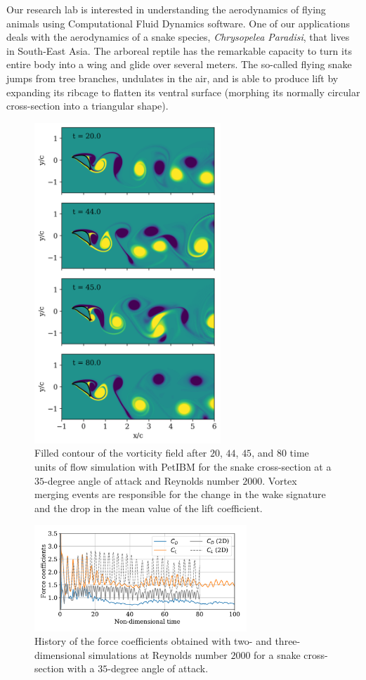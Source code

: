 \documentclass[10pt,journal,compsoc]{IEEEtran}
\begin{document}
Our research lab is interested in understanding the aerodynamics of flying animals using Computational Fluid Dynamics software.
One of our applications deals with the aerodynamics of a snake species, \textit{Chrysopelea Paradisi}, that lives in South-East Asia.
The arboreal reptile has the remarkable capacity to turn its entire body into a wing and glide over several meters\cite{socha_2011}.
The so-called flying snake jumps from tree branches, undulates in the air, and is able to produce lift by expanding its ribcage to flatten its ventral surface (morphing its normally circular cross-section into a triangular shape).

\begin{figure}[!h]
    \centering
    \includegraphics[width=7cm]{figures/wz_multi_contourf.png}
    \caption{Filled contour of the vorticity field after $20$, $44$, $45$, and $80$ time units of flow simulation with PetIBM for the snake cross-section at a $35$-degree angle of attack and Reynolds number $2000$. Vortex merging events are responsible for the change in the wake signature and the drop in the mean value of the lift coefficient.}
    \label{fig:wz_2d}
\end{figure}

\begin{figure}[!h]
    \centering
    \includegraphics[width=8cm]{figures/forceCoefficientsCompare2D.pdf}
    \caption{History of the force coefficients obtained with two- and three-dimensional simulations at Reynolds number $2000$ for a snake cross-section with a $35$-degree angle of attack.}
    \label{fig:force_coefficients}
\end{figure}
\end{document}
